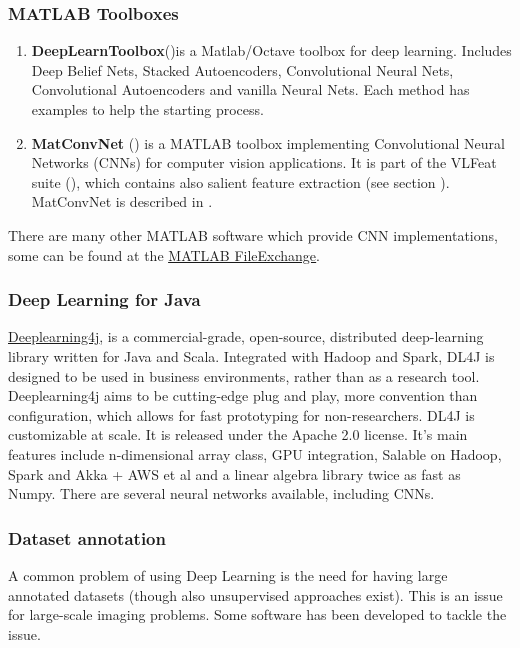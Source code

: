 {\subsubsection{MATLAB Toolboxes}
\begin{enumerate}
\item{{\bf DeepLearnToolbox}(\cite{deeplearntoolbox_soft})is a Matlab/Octave toolbox for deep learning. Includes Deep Belief Nets, Stacked Autoencoders, Convolutional Neural Nets, Convolutional Autoencoders and vanilla Neural Nets. Each method has examples to help the starting process.}
\item{{\bf MatConvNet} (\cite{matconvnet_soft}) is a MATLAB toolbox implementing Convolutional Neural Networks (CNNs) for computer vision applications. It is part of the VLFeat suite (\cite{vlfeat_soft}), which contains also salient feature extraction (see section ). MatConvNet is described in \cite{matconvnet_paper}.}
\end{enumerate}
 There are many other MATLAB software which provide CNN implementations, some can be found at the \href{http://www.mathworks.com/matlabcentral/fileexchange/24291-cnn-convolutional-neural-network-class}{\underline{MATLAB FileExchange}}.

\subsubsection{Deep Learning for Java}
\href{http://deeplearning4j.org/}{\underline{Deeplearning4j}}, \cite{dl4j} is a commercial-grade, open-source, distributed deep-learning library written for Java and Scala. Integrated with Hadoop and Spark, DL4J is designed to be used in business environments, rather than as a research tool. 
Deeplearning4j aims to be cutting-edge plug and play, more convention than configuration, which allows for fast prototyping for non-researchers. DL4J is customizable at scale. It is released under the Apache 2.0 license. It's main features include n-dimensional array class, GPU integration,  Salable on Hadoop, Spark and Akka + AWS et al and a linear algebra library twice as fast as Numpy. There are several neural networks available, including CNNs.


\subsubsection{Dataset annotation}\label{subsec:dbannot}
A common problem of using Deep Learning is the need for having large annotated datasets (though also unsupervised approaches exist). This is an issue for large-scale imaging problems. Some software has been developed to tackle the issue.

}
